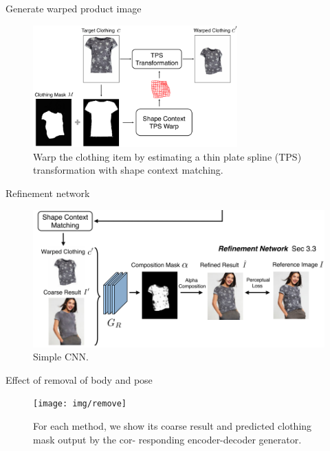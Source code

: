 \documentclass{beamer}
\begin{document}
\begin{frame}{Generate warped product image}

\begin{figure}[h]
\includegraphics[width=0.7\textwidth]{img/warp}
\caption{Warp the clothing item by estimating a thin plate spline (TPS) transformation with shape context matching.}
\end{figure}

\end{frame}
\begin{frame}{Refinement network}

\begin{figure}[h]
\includegraphics[width=\textwidth]{img/refine}
\caption{Simple CNN.}
\end{figure}

\end{frame}
\begin{frame}{Effect of removal of body and pose}

\begin{figure}[h]
\texttt{[image: img/remove]}
\caption{For each method, we show its coarse result and predicted clothing mask output by the cor- responding encoder-decoder generator.}
\end{figure}

\end{frame}
\end{document}
